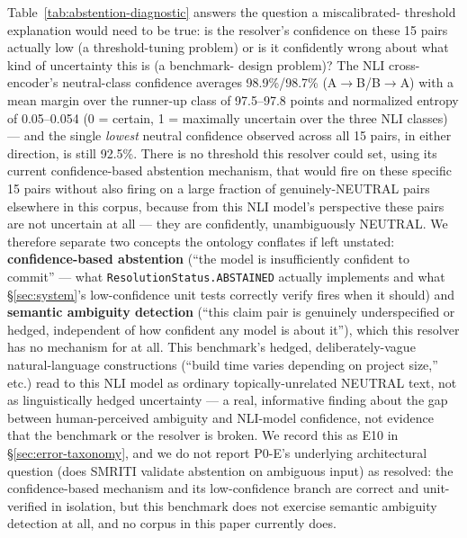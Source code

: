 Table~\ref{tab:abstention-diagnostic} answers the question a miscalibrated-
threshold explanation would need to be true: is the resolver's confidence
on these 15 pairs actually low (a threshold-tuning problem) or is it
confidently wrong about what kind of uncertainty this is (a benchmark-
design problem)? The NLI cross-encoder's neutral-class confidence
averages 98.9\%/98.7\% (A$\to$B/B$\to$A) with a mean margin over the
runner-up class of 97.5--97.8 points and normalized entropy of
0.05--0.054 (0 = certain, 1 = maximally uncertain over the three NLI
classes) --- and the single \emph{lowest} neutral confidence observed
across all 15 pairs, in either direction, is still 92.5\%. There is no
threshold this resolver could set, using its current confidence-based
abstention mechanism, that would fire on these specific 15 pairs without
also firing on a large fraction of genuinely-NEUTRAL pairs elsewhere in
this corpus, because from this NLI model's perspective these pairs are
not uncertain at all --- they are confidently, unambiguously NEUTRAL. We
therefore separate two concepts the ontology conflates if left
unstated: \textbf{confidence-based abstention} (``the model is
insufficiently confident to commit'' --- what
\texttt{ResolutionStatus.ABSTAINED} actually implements and what
\S\ref{sec:system}'s low-confidence unit tests correctly verify fires
when it should) and \textbf{semantic ambiguity detection} (``this claim
pair is genuinely underspecified or hedged, independent of how
confident any model is about it''), which this resolver has no mechanism
for at all. This benchmark's hedged, deliberately-vague natural-language
constructions (``build time varies depending on project size,'' etc.)
read to this NLI model as ordinary topically-unrelated NEUTRAL text, not
as linguistically hedged uncertainty --- a real, informative finding
about the gap between human-perceived ambiguity and NLI-model confidence,
not evidence that the benchmark or the resolver is broken. We record
this as E10 in \S\ref{sec:error-taxonomy}, and we do not report P0-E's
underlying architectural question (does SMRITI validate abstention on
ambiguous input) as resolved: the confidence-based mechanism and its
low-confidence branch are correct and unit-verified in isolation, but
this benchmark does not exercise semantic ambiguity detection at all, and
no corpus in this paper currently does.
